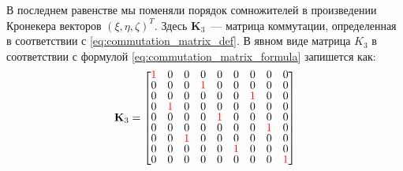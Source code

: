 В последнем равенстве мы поменяли порядок сомножителей в произведении Кронекера
векторов $(\xi,\eta,\zeta)^T$. Здесь $\mathbf{K}_3$~--- матрица коммутации,
определенная в соответствии с \ref{eq:commutation_matrix_def}.
В явном виде матрица $K_3$ в соответствии с формулой  \ref{eq:commutation_matrix_formula}
запишется как:
\begin{equation}
    \renewcommand{\arraystretch}{0.8}
    \mathbf{K}_3 =
    \begin{bmatrix}
        \textcolor{red}{1} & 0 & 0 & 0 & 0 & 0 & 0 & 0 & 0 \\
        0 & 0 & 0 & \textcolor{red}{1} & 0 & 0 & 0 & 0 & 0 \\
        0 & 0 & 0 & 0 & 0 & 0 & \textcolor{red}{1} & 0 & 0 \\
        0 & \textcolor{red}{1} & 0 & 0 & 0 & 0 & 0 & 0 & 0 \\
        0 & 0 & 0 & 0 & \textcolor{red}{1} & 0 & 0 & 0 & 0 \\
        0 & 0 & 0 & 0 & 0 & 0 & 0 & \textcolor{red}{1} & 0 \\
        0 & 0 & \textcolor{red}{1} & 0 & 0 & 0 & 0 & 0 & 0 \\
        0 & 0 & 0 & 0 & 0 & \textcolor{red}{1} & 0 & 0 & 0 \\
        0 & 0 & 0 & 0 & 0 & 0 & 0 & 0 & \textcolor{red}{1}
    \end{bmatrix}
\end{equation}



